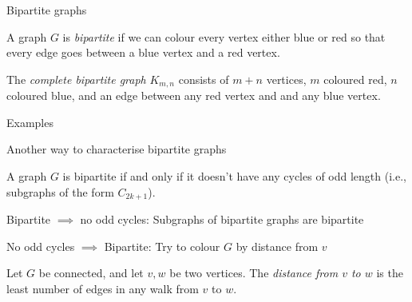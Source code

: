 \documentclass{beamer}
\begin{document}
\begin{frame}{Bipartite graphs}
  \begin{definition} A graph $G$ is \emph{bipartite} if we can colour every vertex either blue or red so that every edge goes between a blue vertex and a red vertex.
  \end{definition}
  \begin{definition} The \emph{complete bipartite graph} $K_{m,n}$ consists of $m+n$ vertices, $m$ coloured red, $n$ coloured blue, and an edge between any red vertex and and any blue vertex.
  \end{definition}

  \begin{block}{Examples}
    \end{block}
\end{frame}

\begin{frame}{Another way to characterise bipartite graphs}  
  \begin{lemma}A graph $G$ is bipartite if and only if it doesn't have any cycles of odd length (i.e., subgraphs of the form $C_{2k+1}$).
    
    \end{lemma}
  \begin{block}{Bipartite $\implies$ no odd cycles:}
    Subgraphs of bipartite graphs are bipartite
  \end{block}
  \begin{block}{No odd cycles $\implies$ Bipartite:}
Try to colour $G$ by distance from $v$   
\end{block}
  \begin{definition}[Distance]Let $G$ be connected, and let $v,w$ be two vertices.  The \emph{distance from $v$ to $w$} is the least number of edges in any walk from $v$ to $w$.
    \end{definition}


  
\end{frame}
\end{document}
